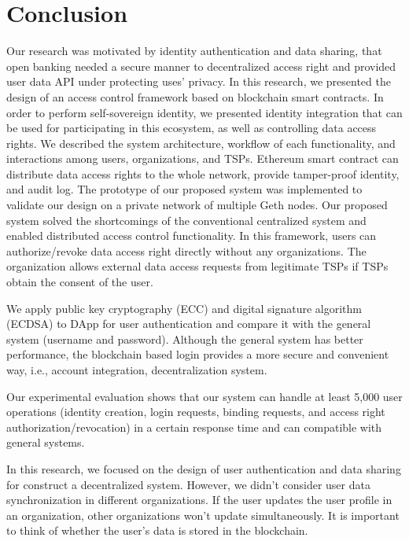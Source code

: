 \chapter{Conclusion}
\label{chapter:conclusion}

Our research was motivated by identity authentication and data sharing, that open banking needed a secure manner to decentralized access right and provided user data API under protecting uses' privacy. In this research, we presented the design of an access control framework based on blockchain smart contracts. In order to perform self-sovereign identity, we presented identity integration that can be used for participating in this ecosystem, as well as controlling data access rights. We described the system architecture, workflow of each functionality, and interactions among users, organizations, and TSPs. Ethereum smart contract can distribute data access rights to the whole network, provide tamper-proof identity, and audit log. 
The prototype of our proposed system was implemented to validate our design on a private network of multiple Geth nodes. Our proposed system solved the shortcomings of the conventional centralized system and enabled distributed access control functionality. In this framework, users can authorize/revoke data access right directly without any organizations. The organization allows external data access requests from legitimate TSPs if TSPs obtain the consent of the user. 
\par

We apply public key cryptography (ECC) and digital signature algorithm (ECDSA) to DApp for user authentication and compare it with the general system (username and password). Although the general system has better performance, the blockchain based login provides a more secure and convenient way, i.e., account integration, decentralization system.\par

Our experimental evaluation shows that our system can handle at least 5,000 user operations (identity creation, login requests, binding requests, and access right authorization/revocation) in a certain response time and can compatible with general systems.\par

In this research, we focused on the design of user authentication and data sharing for construct a decentralized system. However, we didn't consider user data synchronization in different organizations. If the user updates the user profile in an organization, other organizations won't update simultaneously. It is important to think of whether the user's data is stored in the blockchain.